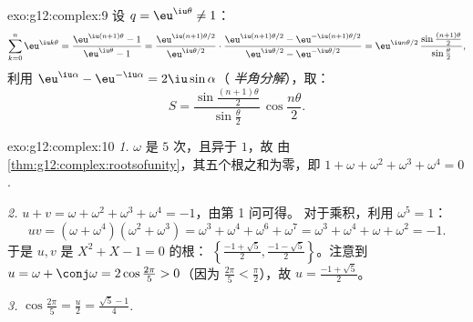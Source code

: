 \begin{solution}{exo:g12:complex:9}
设 $q = \eu^{\iu\theta} \neq 1$：
\[
\sum_{k=0}^{n} \eu^{\iu k\theta} = \frac{\eu^{\iu(n+1)\theta} - 1}{\eu^{\iu\theta} - 1}
= \frac{\eu^{\iu(n+1)\theta/2}}{\eu^{\iu\theta/2}}
\cdot\frac{\eu^{\iu(n+1)\theta/2} - \eu^{-\iu(n+1)\theta/2}}{\eu^{\iu\theta/2} - \eu^{-\iu\theta/2}}
= \eu^{\iu n\theta/2}\,
\frac{\sin\frac{(n+1)\theta}{2}}{\sin\frac{\theta}{2}},
\]
利用 $\eu^{\iu\alpha} - \eu^{-\iu\alpha} = 2\iu\sin\alpha$（
\emph{半角分解}），取：
\[
S = \frac{\sin\frac{(n+1)\theta}{2}}{\sin\frac{\theta}{2}}\,
\cos\frac{n\theta}{2}.
\]
\end{solution}

\begin{solution}{exo:g12:complex:10}
\emph{1.} $\omega$ 是 $5$ 次，且异于 $1$，故
由\cref{thm:g12:complex:rootsofunity}，其五个根之和为零，即
$1 + \omega + \omega^2 + \omega^3 + \omega^4 = 0$.

\emph{2.} $u + v = \omega + \omega^2 + \omega^3 + \omega^4 = -1$，由第 1 问可得。
对于乘积，利用 $\omega^5 = 1$：
\[
uv = (\omega + \omega^4)(\omega^2 + \omega^3)
= \omega^3 + \omega^4 + \omega^6 + \omega^7
= \omega^3 + \omega^4 + \omega + \omega^2 = -1 .
\]
于是 $u, v$ 是 $X^2 + X - 1 = 0$ 的根：
$\left\{\frac{-1+\sqrt5}{2}, \frac{-1-\sqrt5}{2}\right\}$。注意到
$u = \omega + \conj\omega = 2\cos\frac{2\pi}{5} > 0$（因为
$\frac{2\pi}{5} < \frac{\pi}{2}$），故 $u = \frac{-1 + \sqrt5}{2}$。

\emph{3.} $\cos\frac{2\pi}{5} = \frac u2 = \frac{\sqrt5 - 1}{4}$.
\end{solution}

